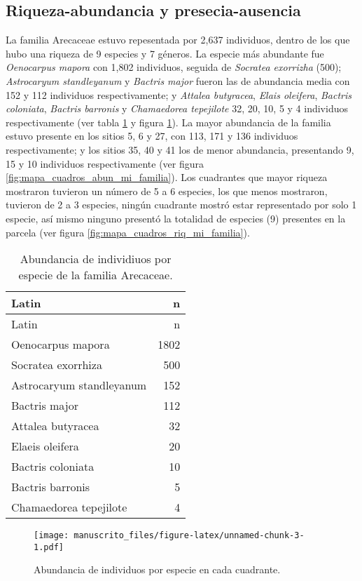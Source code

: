 \documentclass[11pt,]{article}
\begin{document}
\subsection{Riqueza-abundancia y
presecia-ausencia}\label{riqueza-abundancia-y-presecia-ausencia}

La familia Arecaceae estuvo repesentada por 2,637 individuos, dentro de
los que hubo una riqueza de 9 especies y 7 géneros. La especie más
abundante fue \emph{Oenocarpus mapora} con 1,802 individuos, seguida de
\emph{Socratea exorrizha} (500); \emph{Astrocaryum standleyanum} y
\emph{Bactris major} fueron las de abundancia media con 152 y 112
individuos respectivamente; y \emph{Attalea butyracea}, \emph{Elais
oleifera}, \emph{Bactris coloniata}, \emph{Bactris barronis} y
\emph{Chamaedorea tepejilote} 32, 20, 10, 5 y 4 individuos
respectivamente (ver tabla \ref{tab:abun_sp} y figura
\ref{fig:abun_sp_q}). La mayor abundancia de la familia estuvo presente
en los sitios 5, 6 y 27, con 113, 171 y 136 individuos respectivamente;
y los sitios 35, 40 y 41 los de menor abundancia, presentando 9, 15 y 10
individuos respectivamente (ver figura
\ref{fig:mapa_cuadros_abun_mi_familia}). Los cuadrantes que mayor
riqueza mostraron tuvieron un número de 5 a 6 especies, los que menos
mostraron, tuvieron de 2 a 3 especies, ningún cuadrante mostró estar
representado por solo 1 especie, así mismo ninguno presentó la totalidad
de especies (9) presentes en la parcela (ver figura
\ref{fig:mapa_cuadros_riq_mi_familia}).

\begin{longtable}[]{@{}lr@{}}
\caption{\label{tab:abun_sp}Abundancia de individiuos por especie de la
familia Arecaceae.}\tabularnewline
\toprule
Latin & n\tabularnewline
\midrule
\endfirsthead
\toprule
Latin & n\tabularnewline
\midrule
\endhead
Oenocarpus mapora & 1802\tabularnewline
Socratea exorrhiza & 500\tabularnewline
Astrocaryum standleyanum & 152\tabularnewline
Bactris major & 112\tabularnewline
Attalea butyracea & 32\tabularnewline
Elaeis oleifera & 20\tabularnewline
Bactris coloniata & 10\tabularnewline
Bactris barronis & 5\tabularnewline
Chamaedorea tepejilote & 4\tabularnewline
\bottomrule
\end{longtable}

\begin{figure}
\centering
\texttt{[image: manuscrito\_files/figure-latex/unnamed-chunk-3-1.pdf]}
\caption{\label{fig:abun_sp_q}Abundancia de individuos por especie en
cada cuadrante.}
\end{figure}
\end{document}

